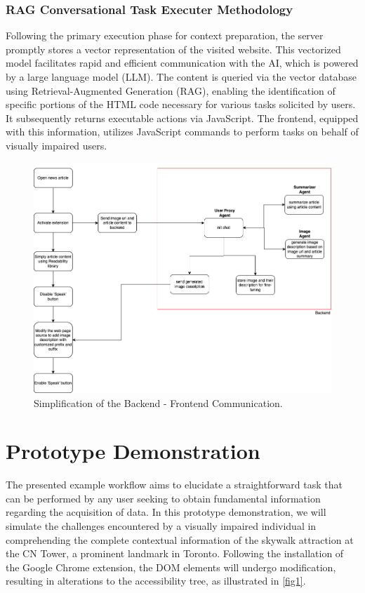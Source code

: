 \documentclass[conference]{IEEEtran}
\begin{document}
\subsubsection{RAG Conversational Task Executer Methodology}

Following the primary execution phase for context preparation, the server promptly stores a vector representation of the visited website. This vectorized model facilitates rapid and efficient communication with the AI, which is powered by a large language model (LLM). The content is queried via the vector database using Retrieval-Augmented Generation (RAG), enabling the identification of specific portions of the HTML code necessary for various tasks solicited by users. It subsequently returns executable actions via JavaScript. The frontend, equipped with this information, utilizes JavaScript commands to perform tasks on behalf of visually impaired users.


\begin{figure}[h]
\centerline{\includegraphics[width=\linewidth]{images/img1.png}}
\caption{Simplification of the Backend - Frontend Communication.}
\label{fig1}
\end{figure}

\section{Prototype Demonstration}

The presented example workflow aims to elucidate a straightforward task that can be performed by any user seeking to obtain fundamental information regarding the acquisition of data. In this prototype demonstration, we will simulate the challenges encountered by a visually impaired individual in comprehending the complete contextual information of the skywalk attraction at the CN Tower, a prominent landmark in Toronto. Following the installation of the Google Chrome extension, the DOM elements will undergo modification, resulting in alterations to the accessibility tree, as illustrated in \autoref{fig1}.
\end{document}
